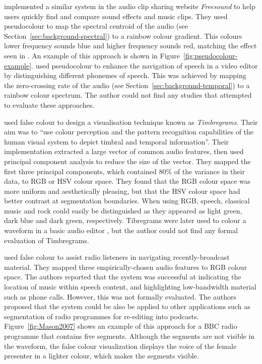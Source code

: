 \citet{Akkermans2011} implemented a similar system in the audio clip sharing website \textit{Freesound} to help users
quickly find and compare sound effects and music clips.  They used pseudocolour to map the spectral centroid of the
audio (see Section~\ref{sec:background-spectral}) to a rainbow colour gradient. This colours lower frequency sounds
blue and higher frequency sounds red, matching the effect seen in \citet{Rice2005}.
An example of this approach is shown in Figure~\ref{fig:pseudocolour-example}.
\citet{Loviscach2011a} used pseudocolour to enhance the navigation of speech in a video editor by distinguishing
different phonemes of speech.  This was achieved by mapping the zero-crossing rate of the audio
(see Section~\ref{sec:background-temporal}) to a rainbow colour spectrum.
The author could not find any studies that attempted to evaluate these approaches.

\citet{Tzanetakis2000} used false colour to design a visualisation technique known as \textit{Timbregrams}. Their aim
was to ``use colour perception and the pattern recognition capabilities of the human visual system to depict timbral
and temporal information''.  Their implementation extracted a large vector of common audio features, then used
principal component analysis to reduce the size of the vector.  They mapped the first three principal components, which
contained 80\% of the variance in their data, to RGB or HSV colour space.  They found that the RGB colour space was
more uniform and aesthetically pleasing, but that the HSV colour space had better contrast at segmentation boundaries.
When using RGB, speech, classical music and rock could easily be distinguished as they appeared as light green, dark
blue and dark green, respectively. Tibregrams were later used to colour a waveform in a basic audio editor \citep[p.
253]{Tzanetakis2001}, but the author could not find any formal evaluation of Timbregrams.


\citet{Mason2007} used false colour to assist radio listeners in navigating recently-broadcast material. They mapped
three empirically-chosen audio features to RGB colour space. The authors reported that the system was successful at
indicating the location of music within speech content, and highlighting low-bandwidth material such as phone calls.
However, this was not formally evaluated.  The authors proposed that the system could be also be applied to other
applications such as segmentation of radio programmes for re-editing into podcasts.  Figure~\ref{fig:Mason2007} shows
an example of this approach for a BBC radio programme that contains five segments.  Although the segments are not
visible in the waveform, the false colour visualization displays the voice of the female presenter in a lighter colour,
which makes the segments visible.




